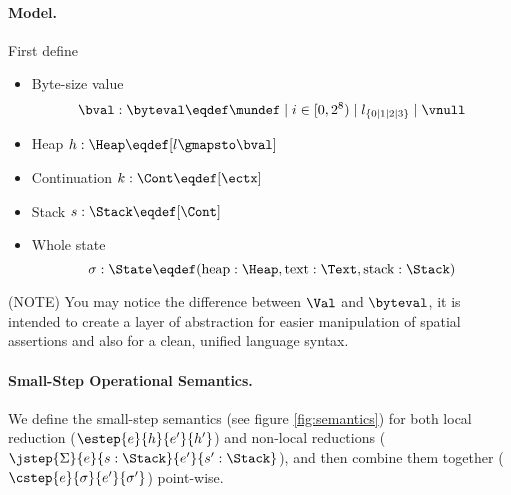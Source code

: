 \paragraph{Model.}

First define
\begin{itemize}
\item Byte-size value \[\bval : \byteval \eqdef \mundef \mid i \in [0, 2^8) \mid l_{\{0 \mid 1 \mid 2 \mid 3\}} \mid \vnull\]
\item Heap $h: \Heap \eqdef [ l \gmapsto \bval ]$
\item Continuation $k: \Cont \eqdef [\ectx]$
\item Stack $s: \Stack \eqdef [\Cont]$
\item Whole state \[\sigma: \State \eqdef (\text{heap}: \Heap, \text{text}: \Text, \text{stack}: \Stack)\]
\end{itemize}

(NOTE) You may notice the difference between $\Val$ and $\byteval$, it is intended to create a layer of abstraction for
easier manipulation of spatial assertions and also for a clean, unified language syntax.

\paragraph{Small-Step Operational Semantics.}

We define the small-step semantics (see figure \ref{fig:semantics}) for both local reduction ($\estep{e}{h}{e'}{h'}$) and
non-local reductions ($\jstep{\Sigma}{e}{s: \Stack}{e'}{s': \Stack}$),
and then combine them together ($\cstep{e}{\sigma}{e'}{\sigma'}$) point-wise.


